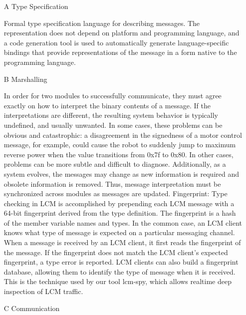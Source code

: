 	\begin{itemize}
	
	\item[A] Type Specification
	
	Formal type specification language for describing messages.
	The representation does not depend on platform and programming language, and a code generation tool is used to automatically generate language-specific bindings that provide representations of the message in a form native to the programming language. 

	
	\item[B] Marshalling
	
	In order for two modules to successfully communicate, they must agree exactly on how to interpret the binary contents of a message. If the interpretations are different, the resulting system behavior is typically undefined, and usually unwanted. In some cases, these problems can be obvious and catastrophic: a disagreement in the signedness of a motor control message, for example, could cause the robot to suddenly jump to maximum reverse power when the value transitions from 0x7f to 0x80. In other cases, problems can be more subtle and difficult to diagnose. Additionally, as a system evolves, the messages may change as new information is required and obsolete information is removed. Thus, message interpretation must be synchronized across modules as messages are updated.
	Fingerprint: Type checking in LCM is accomplished by prepending each LCM message with a 64-bit fingerprint derived from the type definition. The fingerprint is a hash of the member variable names and types. 
	In the common case, an LCM client knows what type of message is expected on a particular messaging channel.
	When a message is received by an LCM client, it first reads the fingerprint of the message. If the fingerprint does not match the LCM client’s expected fingerprint, a type error is reported.
	LCM clients can also build a fingerprint database, allowing them to identify the type of message when it is received. This is the technique used by our tool lcm-spy, which allows realtime deep inspection of LCM traffic.
	
	\item[C] Communication


\end{itemize}
